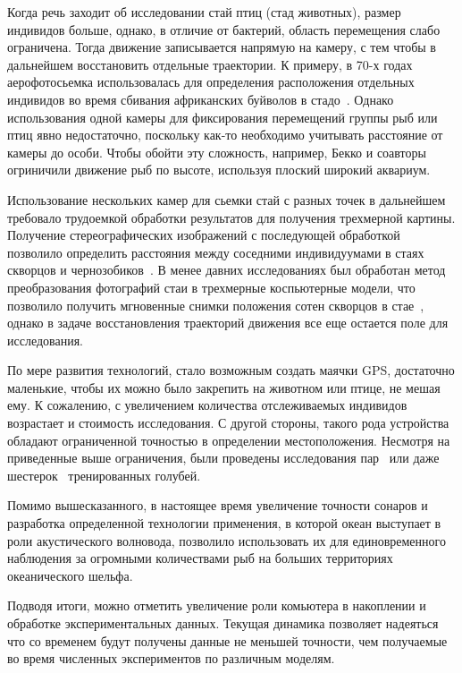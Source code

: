 	Когда речь заходит об исследовании стай птиц (стад животных), размер индивидов больше, однако, в отличие от бактерий, область перемещения слабо ограничена. Тогда движение записывается напрямую на камеру, с тем чтобы в дальнейшем восстановить отдельные траектории. К примеру, в 70-х годах аерофотосьемка использовалась для определения расположения отдельных индивидов во время сбивания африканских буйволов в стадо~\cite{sinclair1977}. Однако использования одной камеры для фиксирования перемещений группы рыб или птиц явно недостаточно, поскольку как-то необходимо учитывать расстояние от камеры до особи. Чтобы обойти эту сложность, например, Бекко и соавторы~\cite{becco2006} огриничили движение рыб по высоте, используя плоский широкий аквариум.

	Использование нескольких камер для сьемки стай с разных точек в дальнейшем требовало трудоемкой обработки результатов для получения трехмерной картины. Получение стереографических изображений с последующей обработкой позволило определить расстояния между соседними индивидуумами в стаях скворцов и чернозобиков~\cite{major1978}. В менее давних исследованиях был обработан метод преобразования фотографий стаи в трехмерные коспьютерные модели, что позволило получить мгновенные снимки положения сотен скворцов в стае~\cite{ballerini2008},  однако в задаче восстановления траекторий движения все еще остается поле для исследования.

	По мере развития технологий, стало возможным создать маячки GPS, достаточно маленькие, чтобы их можно было закрепить на животном или птице, не мешая ему. К сожалению, с увеличением количества отслеживаемых индивидов возрастает и стоимость исследования. С другой стороны, такого рода устройства обладают ограниченной точностью в определении местоположения. Несмотря на приведенные выше ограничения, были проведены исследования пар~\cite{biro2006,nagy2010} или даже шестерок~\cite{dellariccia2008} тренированных голубей.

	Помимо вышесказанного, в настоящее время увеличение точности сонаров и разработка определенной технологии применения, в которой океан выступает в роли акустического волновода, позволило использовать их для единовременного наблюдения за огромными количествами рыб на больших территориях океанического шельфа.~\cite{makris2006}

	Подводя итоги, можно отметить увеличение роли комьютера в накоплении и обработке экспериментальных данных. Текущая динамика позволяет надеяться что со временем будут получены данные не меньшей точности, чем получаемые во время численных экспериментов по различным моделям.
